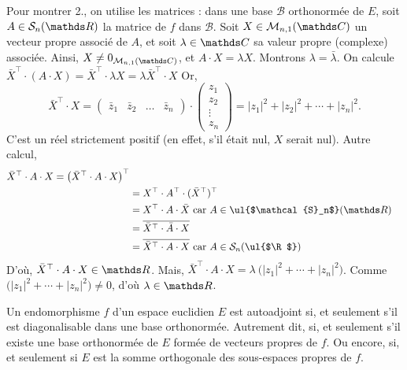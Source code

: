 \begin{prv}
	Pour montrer 2., on utilise les matrices : dans une base $\mathcal{B}$\/ orthonormée de $E$, soit $A \in \mathcal{S}_n(\R)$\/ la matrice de $f$\/ dans $\mathcal{B}$.
	Soit $X \in \mathcal{M}_{n,1}(\C)$\/ un vecteur propre associé de $A$, et soit $\lambda \in \C$\/ sa valeur propre (complexe) associée.
	Ainsi, $X\neq  0_{\mathcal{M}_{n,1}(\C)}$, et $A\cdot X = \lambda X$. Montrons $\lambda = \bar\lambda$.
	On calcule $\bar{X}^\top \cdot (A \cdot X) = \bar{X}^\top \cdot \lambda X = \lambda \bar{X}^\top \cdot X$\/ 
	Or, \[
		\bar{X}^\top \cdot X = \begin{pmatrix}
			\bar{z}_1 & \bar{z}_2 & \ldots & \bar{z}_n
		\end{pmatrix} \cdot \begin{pmatrix}
			z_1\\ z_2\\ \vdots\\ z_n
		\end{pmatrix} = |z_1|^2 + |z_2|^2 + \cdots + |z_n|^2
	.\]
	C'est un réel strictement positif (en effet, s'il était nul, $X$\/ serait nul).
	Autre calcul,
	\begin{align*}
		\bar{X}^\top \cdot A \cdot X = \big(\bar{X}^\top \cdot A \cdot X\big)^\top\\
		&= X^\top \cdot A^\top \cdot (\bar{X}^\top)^\top\\
		&= X^\top \cdot A \cdot \bar{X} \text{ car } A \in \text{\ul{$\mathcal{S}_n$}}(\R)\\
		&= \overline{\bar{X}^\top \cdot \bar{A} \cdot X}\\
		&= \overline{\bar{X}^\top \cdot A \cdot X}  \text{ car } A \in \mathcal{S}_n(\text{\ul{$\R$}})\\
	\end{align*}
	D'où, $\bar{X}^\top \cdot A\cdot X \in \R$.
	Mais, $\bar{X}^\top \cdot A\cdot X = \lambda\:\big(|z_1|^2 + \cdots + |z_n|^2\big)$.
	Comme $\big(|z_1|^2 + \cdots + |z_n|^2\big) \neq 0$, d'où $\lambda \in \R$.
\end{prv}

\begin{thm}
	Un endomorphisme $f$\/ d'un espace euclidien $E$\/ est autoadjoint si, et seulement s'il est diagonalisable dans une base orthonormée.
	Autrement dit, si, et seulement s'il existe une base orthonormée de $E$\/ formée de vecteurs propres de $f$.
	Ou encore, si, et seulement si $E$\/ est la somme orthogonale des sous-espaces propres de $f$.
\end{thm}

